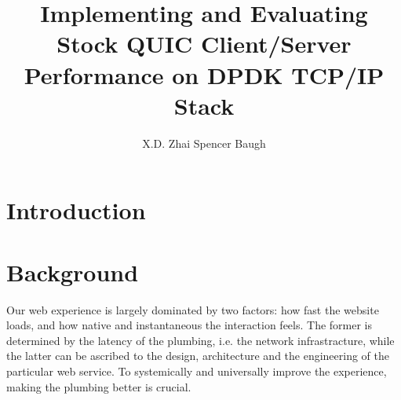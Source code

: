 \documentclass{sig-alternate-05-2015}
\begin{document}
\title{Implementing and Evaluating Stock QUIC Client/Server Performance on DPDK TCP/IP Stack}

\author{
\alignauthor X.D. Zhai
\alignauthor Spencer Baugh 
}

\maketitle
\begin{abstract}

\end{abstract}

\section{Introduction}

\section{Background}
Our web experience is largely dominated by two factors: how fast the website loads, and how native and instantaneous the interaction feels. The former is determined by the latency of the plumbing, i.e. the network infrastracture, while the latter can be ascribed to the design, architecture and the engineering of the particular web service. To systemically and universally improve the experience, making the plumbing better is crucial. 
\end{document}
